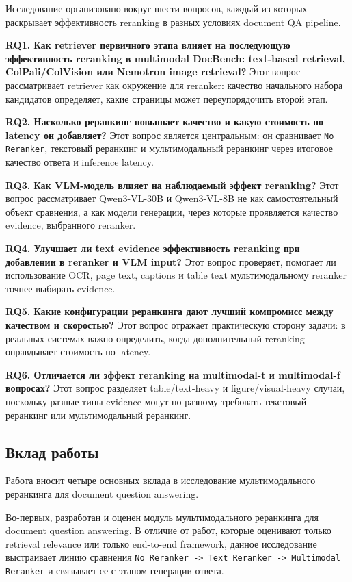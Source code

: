 \documentclass[conference]{IEEEtran}
\begin{document}
Исследование организовано вокруг шести вопросов, каждый из которых раскрывает эффективность reranking в разных условиях document QA pipeline.

\textbf{RQ1. Как retriever первичного этапа влияет на последующую эффективность reranking в multimodal DocBench: text-based retrieval, ColPali/ColVision или Nemotron image retrieval?} Этот вопрос рассматривает retriever как окружение для reranker: качество начального набора кандидатов определяет, какие страницы может переупорядочить второй этап.

\textbf{RQ2. Насколько реранкинг повышает качество и какую стоимость по latency он добавляет?} Этот вопрос является центральным: он сравнивает \texttt{No Reranker}, текстовый реранкинг и мультимодальный реранкинг через итоговое качество ответа и inference latency.

\textbf{RQ3. Как VLM-модель влияет на наблюдаемый эффект reranking?} Этот вопрос рассматривает Qwen3-VL-30B и Qwen3-VL-8B не как самостоятельный объект сравнения, а как модели генерации, через которые проявляется качество evidence, выбранного reranker.

\textbf{RQ4. Улучшает ли text evidence эффективность reranking при добавлении в reranker и VLM input?} Этот вопрос проверяет, помогает ли использование OCR, page text, captions и table text мультимодальному reranker точнее выбирать evidence.

\textbf{RQ5. Какие конфигурации реранкинга дают лучший компромисс между качеством и скоростью?} Этот вопрос отражает практическую сторону задачи: в реальных системах важно определить, когда дополнительный reranking оправдывает стоимость по latency.

\textbf{RQ6. Отличается ли эффект reranking на multimodal-t и multimodal-f вопросах?} Этот вопрос разделяет table/text-heavy и figure/visual-heavy случаи, поскольку разные типы evidence могут по-разному требовать текстовый реранкинг или мультимодальный реранкинг.

\subsection{Вклад работы}

Работа вносит четыре основных вклада в исследование мультимодального реранкинга для document question answering.

Во-первых, разработан и оценен модуль мультимодального реранкинга для document question answering. В отличие от работ, которые оценивают только retrieval relevance или только end-to-end framework, данное исследование выстраивает линию сравнения \texttt{No Reranker -> Text Reranker -> Multimodal Reranker} и связывает ее с этапом генерации ответа.
\end{document}
